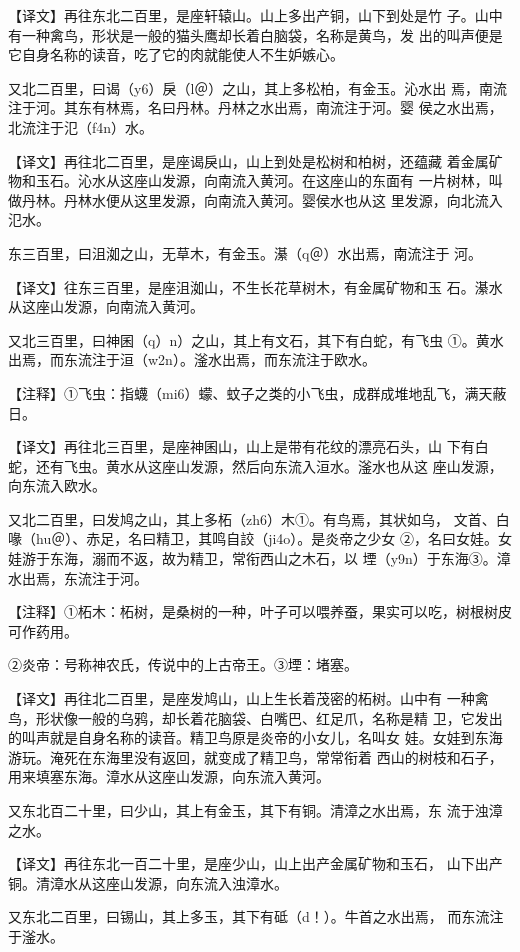 \documentclass[a4paper,12pt,UTF8,twoside]{ctexbook}
\begin{document}
【译文】再往东北二百里，是座轩辕山。山上多出产铜，山下到处是竹 子。山中有一种禽鸟，形状是一般的猫头鹰却长着白脑袋，名称是黄鸟，发 出的叫声便是它自身名称的读音，吃了它的肉就能使人不生妒嫉心。

又北二百里，曰谒（y6）戾（l＠）之山，其上多松柏，有金玉。沁水出 焉，南流注于河。其东有林焉，名曰丹林。丹林之水出焉，南流注于河。婴 侯之水出焉，北流注于氾（f4n）水。

【译文】再往北二百里，是座谒戾山，山上到处是松树和柏树，还蕴藏 着金属矿物和玉石。沁水从这座山发源，向南流入黄河。在这座山的东面有 一片树林，叫做丹林。丹林水便从这里发源，向南流入黄河。婴侯水也从这 里发源，向北流入氾水。

东三百里，曰沮洳之山，无草木，有金玉。濝（q＠）水出焉，南流注于 河。

【译文】往东三百里，是座沮洳山，不生长花草树木，有金属矿物和玉 石。濝水从这座山发源，向南流入黄河。

又北三百里，曰神囷（q）n）之山，其上有文石，其下有白蛇，有飞虫 ①。黄水出焉，而东流注于洹（w2n）。滏水出焉，而东流注于欧水。

【注释】①飞虫：指蠛（mi6）蠓、蚊子之类的小飞虫，成群成堆地乱飞，满天蔽日。

【译文】再往北三百里，是座神囷山，山上是带有花纹的漂亮石头，山 下有白蛇，还有飞虫。黄水从这座山发源，然后向东流入洹水。滏水也从这 座山发源，向东流入欧水。

又北二百里，曰发鸠之山，其上多柘（zh6）木①。有鸟焉，其状如乌， 文首、白喙（hu＠）、赤足，名曰精卫，其鸣自詨（ji4o）。是炎帝之少女 ②，名曰女娃。女娃游于东海，溺而不返，故为精卫，常衔西山之木石，以 堙（y9n）于东海③。漳水出焉，东流注于河。

【注释】①柘木：柘树，是桑树的一种，叶子可以喂养蚕，果实可以吃，树根树皮可作药用。

②炎帝：号称神农氏，传说中的上古帝王。③堙：堵塞。

【译文】再往北二百里，是座发鸠山，山上生长着茂密的柘树。山中有 一种禽鸟，形状像一般的乌鸦，却长着花脑袋、白嘴巴、红足爪，名称是精 卫，它发出的叫声就是自身名称的读音。精卫鸟原是炎帝的小女儿，名叫女 娃。女娃到东海游玩。淹死在东海里没有返回，就变成了精卫鸟，常常衔着 西山的树枝和石子，用来填塞东海。漳水从这座山发源，向东流入黄河。

又东北百二十里，曰少山，其上有金玉，其下有铜。清漳之水出焉，东 流于浊漳之水。

【译文】再往东北一百二十里，是座少山，山上出产金属矿物和玉石， 山下出产铜。清漳水从这座山发源，向东流入浊漳水。

又东北二百里，曰锡山，其上多玉，其下有砥（d！）。牛首之水出焉， 而东流注于滏水。
\end{document}

